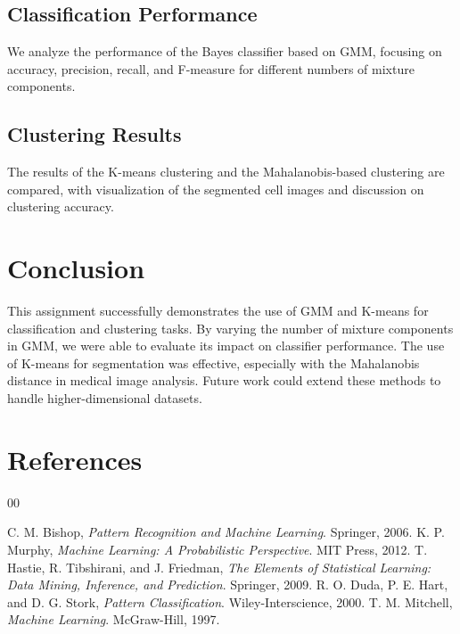 \documentclass[conference]{IEEEtran}
\begin{document}
	\subsection{Classification Performance}
	
	We analyze the performance of the Bayes classifier based on GMM, focusing on accuracy, precision, recall, and F-measure for different numbers of mixture components.
	
	\subsection{Clustering Results}
	
	The results of the K-means clustering and the Mahalanobis-based clustering are compared, with visualization of the segmented cell images and discussion on clustering accuracy.
	
	\section{Conclusion}
	
	This assignment successfully demonstrates the use of GMM and K-means for classification and clustering tasks. By varying the number of mixture components in GMM, we were able to evaluate its impact on classifier performance. The use of K-means for segmentation was effective, especially with the Mahalanobis distance in medical image analysis. Future work could extend these methods to handle higher-dimensional datasets.
	
	\section{References}
	
	\begin{thebibliography}{00}
		
		 C. M. Bishop, \textit{Pattern Recognition and Machine Learning}. Springer, 2006.
		 K. P. Murphy, \textit{Machine Learning: A Probabilistic Perspective}. MIT Press, 2012.
		 T. Hastie, R. Tibshirani, and J. Friedman, \textit{The Elements of Statistical Learning: Data Mining, Inference, and Prediction}. Springer, 2009.
		 R. O. Duda, P. E. Hart, and D. G. Stork, \textit{Pattern Classification}. Wiley-Interscience, 2000.
		 T. M. Mitchell, \textit{Machine Learning}. McGraw-Hill, 1997.
		
	\end{thebibliography}
	
	
\end{document}
